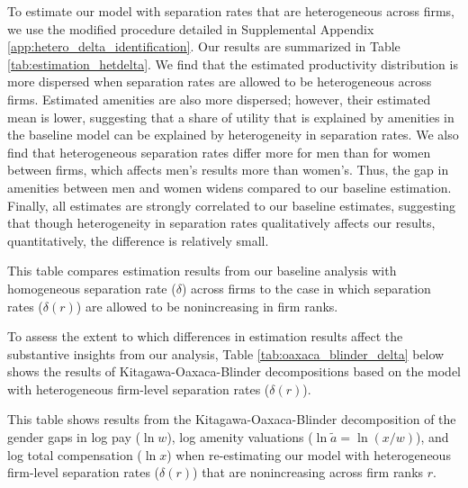 To estimate our model with separation rates that are heterogeneous across firms, we use the modified procedure detailed in Supplemental Appendix \ref{app:hetero_delta_identification}. Our results are summarized in Table \ref{tab:estimation_hetdelta}. We find that the estimated productivity distribution is more dispersed when separation rates are allowed to be heterogeneous across firms. Estimated amenities are also more dispersed; however, their estimated mean is lower, suggesting that a share of utility that is explained by amenities in the baseline model can be explained by heterogeneity in separation rates. We also find that heterogeneous separation rates differ more for men than for women between firms, which affects men's results more than women's. Thus, the gap in amenities between men and women widens compared to our baseline estimation. Finally, all estimates are strongly correlated to our baseline estimates, suggesting that though heterogeneity in separation rates qualitatively affects our results, quantitatively, the difference is relatively small.

%
\begin{table}[htbp!]
    \caption{Estimation results under heterogeneous separation rates}
    \label{tab:estimation_hetdelta}
    \resizebox{\textwidth}{!}{%
    
    }
    \begin{tablenotes}
        \footnotesize
        This table compares estimation results from our baseline analysis with homogeneous separation rate ($\delta$) across firms to the case in which separation rates ($\delta(r)$) are allowed to be nonincreasing in firm ranks. %
    \end{tablenotes}
    \begin{tablenotes}[Source]
        \sourcemodel%
    \end{tablenotes}
\end{table}
%

To assess the extent to which differences in estimation results affect the substantive insights from our analysis, Table \ref{tab:oaxaca_blinder_delta} below shows the results of Kitagawa-Oaxaca-Blinder decompositions based on the model with heterogeneous firm-level separation rates ($\delta(r)$).
%
\begin{table}[htbp!]
    \caption{Kitagawa-Oaxaca-Blinder decompositions---heterogeneous firm-level separation rates ($\delta(r)$)\label{tab:oaxaca_blinder_delta}}
    \resizebox{\textwidth}{!}{%
    
    }
    \begin{tablenotes}
        \footnotesize
        This table shows results from the Kitagawa-Oaxaca-Blinder decomposition of the gender gaps in log pay ($\ln w$), log amenity valuations ($\ln \tilde{a} = \ln(x/w)$), and log total compensation ($\ln x$) when re-estimating our model with heterogeneous firm-level separation rates ($\delta(r)$) that are nonincreasing across firm ranks $r$. %
    \end{tablenotes}
    \begin{tablenotes}[Source]
        \sourcemodel%
    \end{tablenotes}
\end{table}
%

